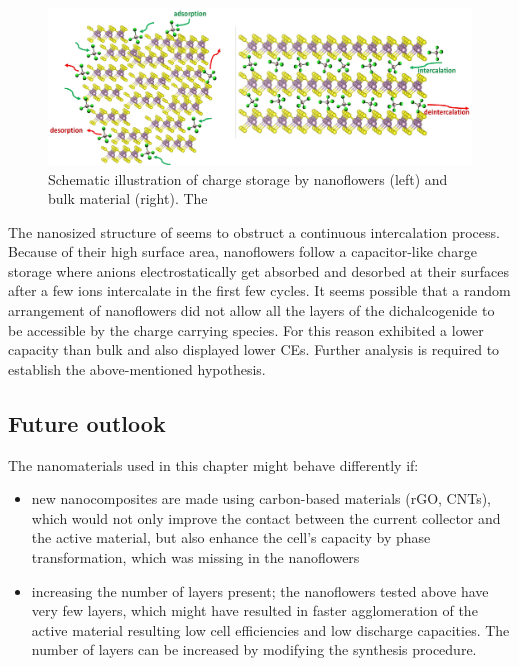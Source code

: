 \begin{figure}[h!]
  \centering
  \includegraphics[width=\textwidth]{Figures/chap6fig/nanbulkmox2.pdf}
    \caption{Schematic illustration of charge storage by  nanoflowers (left) and bulk material (right). The }
  \label{Figures/chap6fig:nanbulkmox2}
\end{figure}

The nanosized structure of  seems to obstruct a continuous intercalation process. Because of their high surface area,  nanoflowers follow a capacitor-like charge storage where  anions electrostatically get absorbed and desorbed at their surfaces after a few  ions intercalate in the first few cycles. It seems possible that a random arrangement of  nanoflowers did not allow all the layers of the dichalcogenide to be accessible by the charge carrying species. For this reason  exhibited a lower capacity than bulk and also displayed lower CEs. Further analysis is required to establish the above-mentioned hypothesis. 

\subsection{Future outlook}
The nanomaterials used in this chapter might behave differently if:
\begin{itemize}
    \item new nanocomposites are made using carbon-based materials (rGO, CNTs), which would not only improve the contact between the current collector and the active material, but also enhance the cell's capacity by phase transformation, which was missing in the nanoflowers
    \item increasing the number of layers present; the nanoflowers tested above have very few layers, which might have resulted in faster agglomeration of the active material resulting low cell efficiencies and low discharge capacities. The number of layers can be increased by modifying the synthesis procedure. 
\end{itemize}

